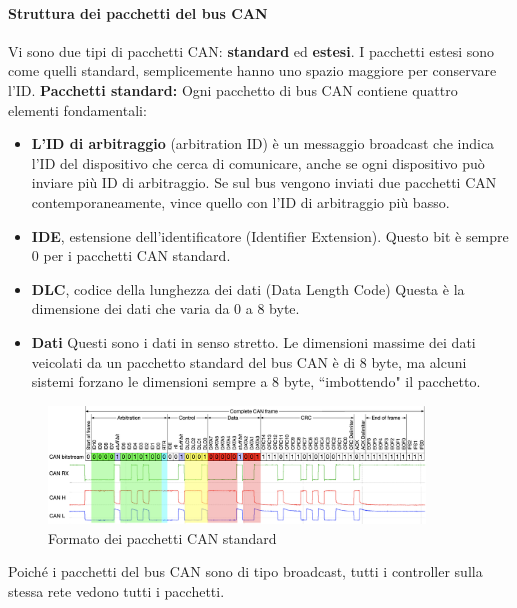 \documentclass[12pt, a4paper, italian]{report}
\numberwithin{figure}{chapter}
\numberwithin{table}{chapter}
\begin{document}
\paragraph{Struttura dei pacchetti del bus CAN}
Vi sono due tipi di pacchetti CAN: 
\textbf{standard} ed \textbf{estesi}. I pacchetti estesi sono come quelli standard, semplicemente hanno uno spazio maggiore per conservare l'ID. \textbf{Pacchetti standard:} Ogni pacchetto di bus CAN contiene quattro elementi fondamentali:
\begin{itemize}
    \item \textbf{L'ID di arbitraggio} (arbitration ID) è un messaggio broadcast che indica l'ID del dispositivo che cerca di comunicare, anche se ogni dispositivo può inviare più ID di arbitraggio. Se sul bus vengono inviati due pacchetti CAN contemporaneamente, vince quello con l'ID di arbitraggio più basso.
    \item \textbf{IDE}, estensione dell'identificatore (Identifier Extension). Questo bit è sempre 0 per i pacchetti CAN standard.
    \item \textbf{DLC}, codice della lunghezza dei dati (Data Length Code) Questa è la dimensione dei dati che varia da 0 a 8 byte.
    \item \textbf{Dati} Questi sono i dati in senso stretto. Le dimensioni massime dei dati veicolati da un pacchetto standard del bus CAN è di 8 byte, ma alcuni sistemi forzano le dimensioni sempre a 8 byte, ``imbottendo" il pacchetto.
\end{itemize}

\begin{figure}[h]
  \centering
  \includegraphics[width=10cm]{FrameCAN.png}
  \caption{Formato dei pacchetti CAN standard}
  \label{fig:pacchettoCAN}
\end{figure}

Poiché i pacchetti del bus CAN sono di tipo broadcast, tutti i controller sulla stessa rete vedono tutti i pacchetti. 
\end{document}
